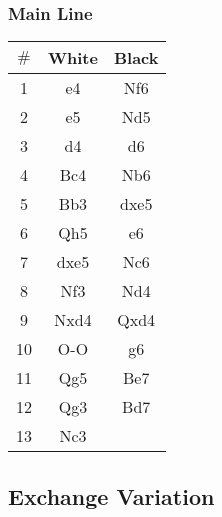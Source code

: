 \documentclass{article}
\newcommand{\smalls}{\par\smallskip}
\begin{document}

        \subsubsection*{Main Line}
        \begin{multicols}{2}
            \showboard
            \smalls
            \begin{tabular}{c|c|c}
            $\#$ & White & Black\\
            \hline
            1 & e4 & Nf6 \\
            2 & e5 & Nd5 \\
            3 & d4 & d6 \\
            4 & Bc4 & Nb6 \\
            5 & Bb3 & dxe5 \\
            6 & Qh5 & e6 \\
            7 & dxe5 & Nc6 \\
            8 & Nf3 & Nd4 \\
            9 & Nxd4 & Qxd4 \\
            10 & O-O & g6 \\
            11 & Qg5 & Be7 \\
            12 & Qg3 & Bd7 \\
            13 & Nc3 & \\
        \end{tabular}
        \end{multicols}
        \smalls
        \newpage

    \subsection*{Exchange Variation}
\end{document}
